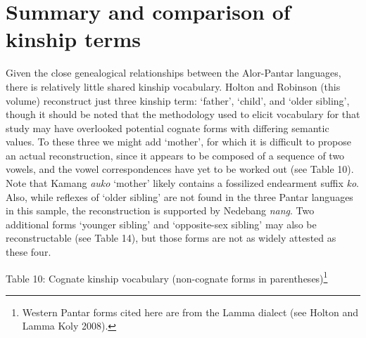 \section[Summary and comparison of kinship terms]{Summary and comparison of kinship terms}
\hypertarget{RefHeading78033871885726}{}Given the close genealogical relationships between the Alor-Pantar languages, there is relatively little shared kinship vocabulary. Holton and Robinson (this volume) reconstruct just three kinship term: {\textquoteleft}father{\textquoteright}, {\textquoteleft}child{\textquoteright}, and {\textquoteleft}older sibling{\textquoteright}, though it should be noted that the methodology used to elicit vocabulary for that study may have overlooked potential cognate forms with differing semantic values. To these three we might add {\textquoteleft}mother{\textquoteright}, for which it is difficult to propose an actual reconstruction, since it appears to be composed of a sequence of two vowels, and the vowel correspondences have yet to be worked out (see Table 10). Note that Kamang \textit{auko} {\textquoteleft}mother{\textquoteright} likely contains a fossilized endearment suffix \textit{ko}. Also, while reflexes of {\textquoteleft}older sibling{\textquoteright} are not found in 
the three Pantar languages in this sample, the reconstruction is supported by Nedebang \textit{nang}. Two additional forms {\textquoteleft}younger sibling{\textquoteright} and {\textquoteleft}opposite-sex sibling{\textquoteright} may also be reconstructable (see Table 14), but those forms are not as widely attested as these four.

{\centering
Table 10: Cognate kinship vocabulary (non-cognate forms in parentheses)\footnote{ Western Pantar forms cited here are from the Lamma dialect (see Holton and Lamma Koly 2008).}
\par}

